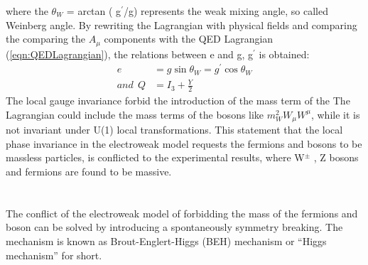 where the $\theta_{W}$ = arctan ( g$^{\prime}$/g) represents the weak mixing angle, so called Weinberg angle. By rewriting the Lagrangian with physical fields and comparing the comparing the $A_{\mu}$ components with the QED Lagrangian (\ref{eqn:QEDLagrangian}), the relations between e and g, g$^{\prime}$ is obtained:
\begin{equation}
\begin{aligned}
e&=g \sin \theta_{W}=g^{\prime} \cos \theta_{W} \\
and \ \ Q&=I_{3}+\frac{Y}{2}
\end{aligned}
\end{equation}
The local gauge invariance forbid the introduction of the mass term of the 
The Lagrangian could include the mass terms of the bosons like $m^2_W W_\mu W^\mu$, while it is not invariant under U(1) local transformations.
This statement that the local phase invariance in the electroweak model requests the fermions and bosons to be massless particles, is conflicted to the experimental results, where W$^{\pm}$ , Z bosons and fermions are found to be massive.
\\ \\
\noindent\textbf{} \\ 
The conflict of the electroweak model of forbidding the mass of the fermions and boson can be solved by introducing a spontaneously symmetry breaking.
The mechanism is known as Brout-Englert-Higgs (BEH) mechanism or “Higgs mechanism” for short.

